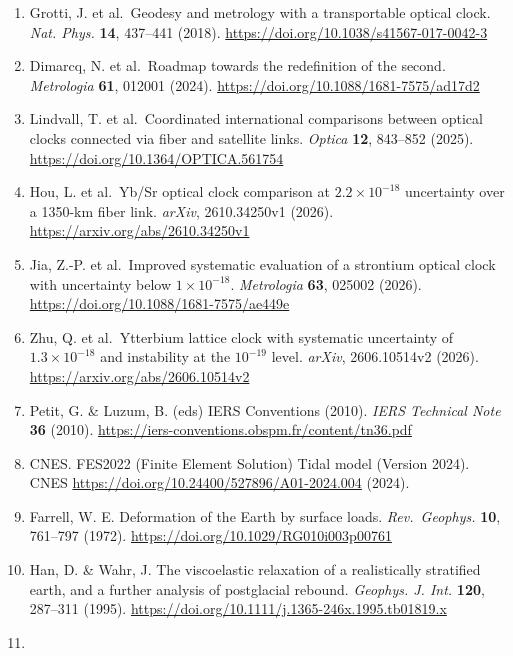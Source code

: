 \documentclass[
  10pt,
  a4paper,
]{article}
\begin{document}
\begin{enumerate}
  McGrew, W. F. et al.~Atomic clock performance enabling geodesy below
  the centimetre level. \emph{Nature} \textbf{564}, 87--90 (2018).
  \url{https://doi.org/10.1038/s41586-018-0738-2}
\item
  Grotti, J. et al.~Geodesy and metrology with a transportable optical
  clock. \emph{Nat. Phys.} \textbf{14}, 437--441 (2018).
  \url{https://doi.org/10.1038/s41567-017-0042-3}
\item
  Dimarcq, N. et al.~Roadmap towards the redefinition of the second.
  \emph{Metrologia} \textbf{61}, 012001 (2024).
  \url{https://doi.org/10.1088/1681-7575/ad17d2}
\item
  Lindvall, T. et al.~Coordinated international comparisons between
  optical clocks connected via fiber and satellite links. \emph{Optica}
  \textbf{12}, 843--852 (2025).
  \url{https://doi.org/10.1364/OPTICA.561754}
\item
  Hou, L. et al.~Yb/Sr optical clock comparison at \(2.2\times10^{-18}\)
  uncertainty over a 1350-km fiber link. \emph{arXiv}, 2610.34250v1
  (2026). \url{https://arxiv.org/abs/2610.34250v1}
\item
  Jia, Z.-P. et al.~Improved systematic evaluation of a strontium
  optical clock with uncertainty below \(1\times10^{-18}\).
  \emph{Metrologia} \textbf{63}, 025002 (2026).
  \url{https://doi.org/10.1088/1681-7575/ae449e}
\item
  Zhu, Q. et al.~Ytterbium lattice clock with systematic uncertainty of
  \(1.3\times 10^{-18}\) and instability at the \(10^{-19}\) level.
  \emph{arXiv}, 2606.10514v2 (2026).
  \url{https://arxiv.org/abs/2606.10514v2}
\item
  Petit, G. \& Luzum, B. (eds) IERS Conventions (2010). \emph{IERS
  Technical Note} \textbf{36} (2010).
  \url{https://iers-conventions.obspm.fr/content/tn36.pdf}
\item
  CNES. FES2022 (Finite Element Solution) Tidal model (Version 2024).
  CNES \url{https://doi.org/10.24400/527896/A01-2024.004} (2024).
\item
  Farrell, W. E. Deformation of the Earth by surface loads.
  \emph{Rev.~Geophys.} \textbf{10}, 761--797 (1972).
  \url{https://doi.org/10.1029/RG010i003p00761}
\item
  Han, D. \& Wahr, J. The viscoelastic relaxation of a realistically
  stratified earth, and a further analysis of postglacial rebound.
  \emph{Geophys. J. Int.} \textbf{120}, 287--311 (1995).
  \url{https://doi.org/10.1111/j.1365-246x.1995.tb01819.x}
\item

\end{enumerate}
\end{document}
